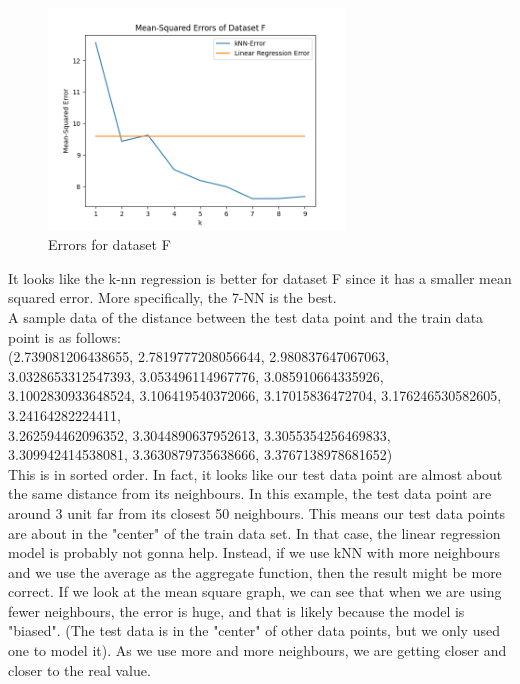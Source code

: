 \documentclass[10pt,letter,notitlepage]{article}
\newcounter{exercise}
\begin{document}
\begin{exercise}
\begin{enumerate}
{      \begin{figure}[H]
      \centering
      \includegraphics[width=0.7\textwidth]{Exercise4_dataset_F_error.png}
      \caption{Errors for dataset F}
      \end{figure}
      \color{orange}
      It looks like the k-nn regression is better for dataset F since it has a smaller mean squared error. 
      More specifically, the 7-NN is the best. \\
      A sample data of the distance between the test data point and the train data point is as follows: \\
      (2.739081206438655, 2.7819777208056644, 2.980837647067063, 3.0328653312547393, 3.053496114967776, 3.085910664335926, 3.1002830933648524,
      3.106419540372066, 3.17015836472704, 3.176246530582605, 3.24164282224411,\\
      3.262594462096352, 3.3044890637952613, 3.3055354256469833, 3.309942414538081, 3.3630879735638666, 3.3767138978681652) \\
      This is in sorted order. In fact, it looks like our test data point are almost about the same distance from 
      its neighbours. In this example, the test data point are around 3 unit far from its closest 50 neighbours.
      This means our test data points are about in the "center" of the train data set. In that case, the linear 
      regression model is probably not gonna help. Instead, if we use kNN with more neighbours and we use the 
      average as the aggregate function, then the result might be more correct. If we look at the mean square 
      graph, we can see that when we are using fewer neighbours, the error is huge, and that is likely because 
      the model is "biased". (The test data is in the "center" of other data points, but we only used one to model it).
      As we use more and more neighbours, we are getting closer and closer to the real value. 

    }
  \end{enumerate}
\end{exercise}
\end{document}

